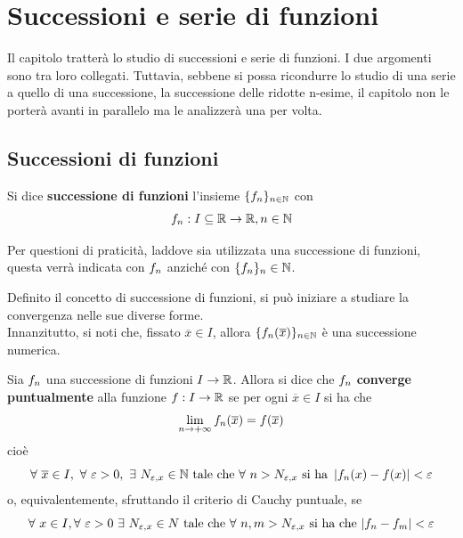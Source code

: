 \chapter{Successioni e serie di funzioni}
Il capitolo tratterà lo studio di successioni e serie di funzioni. I due argomenti sono tra loro collegati. Tuttavia, sebbene si possa ricondurre lo studio di una serie a quello di una successione, la successione delle ridotte n-esime, il capitolo non le porterà avanti in parallelo ma le analizzerà una per volta.
\section{Successioni di funzioni}
\begin{definition} \label{Def: Successione di funzioni}
     Si dice \textbf{successione di funzioni} l'insieme $\{f_n\}_{n \in \mathbb{N}}$ con
     \begin{equation*}
         f_n: I \subseteq \mathbb{R} \to \mathbb{R}, n \in \mathbb{N}
     \end{equation*}
\end{definition}
\begin{oss}
    Per questioni di praticità, laddove sia utilizzata una successione di funzioni, questa verrà indicata con $f_n$ anziché con $\{f_n\}_n\in \mathbb{N}$.
\end{oss}
Definito il concetto di successione di funzioni, si può iniziare a studiare la convergenza nelle sue diverse forme.\\
Innanzitutto, si noti che, fissato $\overline{x}\in I$, 
allora $\{f_n(\overline{x})\}_{n \in \mathbb{N}}$ è una successione numerica.
\begin{definition} \label{Def: Convergenza puntuale succ}
    Sia $f_n$ una successione di funzioni $I\to \mathbb{R}$. Allora si dice che $f_n$ \textbf{converge puntualmente} alla funzione $f: I \to \mathbb{R}$ se per ogni $\overline{x} \in I$ si ha che
    \begin{equation*}
        \lim_{n \to +\infty} f_n(\overline{x}) = f(\overline{x})
    \end{equation*}
    cioè
    \begin{equation*}
        \forall\ \overline{x} \in I,\ \forall\ \varepsilon > 0,\ \exists\ N_{\varepsilon, x} \in \N\ \text{tale che}\ \forall\ n> N_{\varepsilon,x}\ \text{si ha}\ \left| \fn(x)-f(x)\right| < \varepsilon
    \end{equation*}
    o, equivalentemente, sfruttando il criterio di Cauchy puntuale, se
\begin{equation*}
    \forall\ x \in I, \forall\ \varepsilon > 0\ \exists\ N_{\varepsilon, x} \in N\ \text{tale che}\ \forall\ n,m > N_{\varepsilon, x}\ \text{si ha che}\ |\fn - f_m|<\varepsilon
\end{equation*}
\end{definition}    
